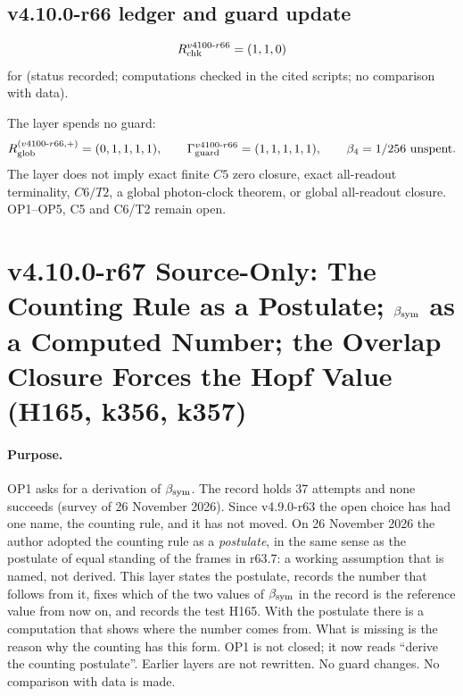 \subsection*{v4.10.0-r66 ledger and guard update}
\label{subsec:v4100-r66-ledger-guard}

\[
R_{\rm chk}^{v4100\text{-}r66}=(1,1,0)
\]
for (status recorded; computations checked in the cited scripts; no comparison with data).

The layer spends no guard:
\[
R_{\rm glob}^{(v4100\text{-}r66,+)}=(0,1,1,1,1),
\qquad
\Gamma_{\rm guard}^{v4100\text{-}r66}=(1,1,1,1,1),
\qquad
\beta_4=1/256\ \text{unspent}.
\]
The layer does not imply exact finite \(C5\) zero closure, exact all-readout terminality, \(C6/T2\), a global photon-clock theorem,
or global all-readout closure.  OP1--OP5, C5 and C6/T2 remain open.

\clearpage
\section*{v4.10.0-r67 Source-Only: The Counting Rule as a Postulate; \texorpdfstring{\(\beta_{\rm sym}\)}{beta sym} as a Computed Number; the Overlap Closure Forces the Hopf Value (H165, k356, k357)}
\label{sec:v4100-r67-counting-postulate}

\paragraph{Purpose.}
OP1 asks for a derivation of \(\beta_{\rm sym}\).  The record holds 37 attempts and none succeeds (survey of 26 November 2026).  Since v4.9.0-r63
the open choice has had one name, the counting rule, and it has not moved.  On 26 November 2026 the author adopted the counting rule as a
\emph{postulate}, in the same sense as the postulate of equal standing of the frames in r63.7: a working assumption that is named, not derived.
This layer states the postulate, records the number that follows from it, fixes which of the two values of \(\beta_{\rm sym}\) in the record is
the reference value from now on, and records the test H165.  With the postulate there is a computation that shows where the number comes from.
What is missing is the reason why the counting has this form.  OP1 is not closed; it now reads ``derive the counting postulate''.  Earlier
layers are not rewritten.  No guard changes.  No comparison with data is made.

